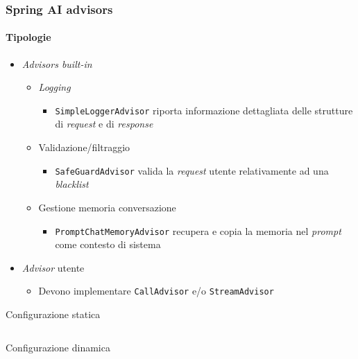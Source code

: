 %
\begin{frame}[t,fragile] \frametitle{Spring AI advisors}
    \framesubtitle{Tipologie}
    \vspace*{-.7cm}
    {\footnotesize
    \begin{itemize}[leftmargin=10pt,align=right]
        \item[\alert{\faArrowCircleRight}] \textit{Advisors built-in}
        \begin{itemize}[leftmargin=10pt,align=right]
            \item[\alert{\faArrowCircleRight}] \textit{Logging}
            \begin{itemize}[leftmargin=10pt,align=right]
                \item[\alert{\faArrowCircleRight}] \alert{\texttt{SimpleLoggerAdvisor}} riporta informazione dettagliata delle strutture di \textit{request} e di \textit{response}
            \end{itemize}
            \item[\alert{\faArrowCircleRight}] Validazione/filtraggio
            \begin{itemize}[leftmargin=10pt,align=right]
                \item[\alert{\faArrowCircleRight}] \alert{\texttt{SafeGuardAdvisor}} valida la \textit{request} utente relativamente ad una \textit{blacklist}
            \end{itemize}
            \item[\alert{\faArrowCircleRight}] Gestione memoria conversazione
            \begin{itemize}[leftmargin=10pt,align=right]
                \item[\alert{\faArrowCircleRight}] \alert{\texttt{PromptChatMemoryAdvisor}} recupera e copia la memoria nel \textit{prompt} come contesto di sistema
            \end{itemize}
        \end{itemize}
        \item[\alert{\faArrowCircleRight}] \textit{Advisor} utente
        \begin{itemize}[leftmargin=10pt,align=right]
            \item[\alert{\faArrowCircleRight}] Devono implementare \texttt{CallAdvisor} \alert{e/o} \texttt{StreamAdvisor}
        \end{itemize}
    \end{itemize}
    \begin{block}{Configurazione statica}
		{\tiny\inputminted{java}{code/DefaultAdvisorsExample.java}}
    \end{block}
    \begin{block}{Configurazione dinamica}
		{\tiny\inputminted{java}{code/AdvisorsExample.java}}
    \end{block}
    }
\end{frame}
